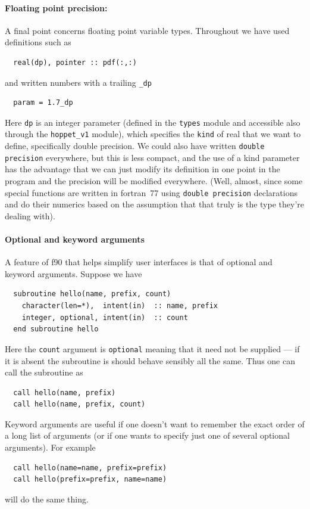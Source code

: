 \documentclass[12pt]{article}
\newcommand{\ttt}[1]{\texttt{#1}}
\begin{document}
\paragraph{Floating point precision:}
A final point concerns floating point variable types. Throughout we
have used definitions such as
\begin{verbatim}
  real(dp), pointer :: pdf(:,:)
\end{verbatim}
and written numbers with a trailing \texttt{\_dp}
\begin{verbatim}
  param = 1.7_dp
\end{verbatim}
Here \texttt{dp} is an integer parameter (defined in the
\texttt{types} module and accessible also through the
\texttt{hoppet\_v1} module), which specifies the \texttt{kind} of real
that we want to define, specifically double precision. We could also
have written \texttt{double precision} everywhere, but this is less
compact, and the use of a kind parameter has the advantage that we
can just modify its definition in one point in the program and the
precision will be modified everywhere. (Well, almost, since some
special functions are written in fortran~77 using \texttt{double
  precision} declarations and do their numerics based on the
assumption that that truly is the type they're dealing with).


\paragraph{Optional and keyword arguments}

A feature of f90 that helps simplify user interfaces is that of
optional and keyword arguments. Suppose we have
\begin{verbatim}
  subroutine hello(name, prefix, count)
    character(len=*),  intent(in)  :: name, prefix
    integer, optional, intent(in)  :: count
  end subroutine hello
\end{verbatim}
Here the \ttt{count} argument is \ttt{optional} meaning that it need
not be supplied --- if it is absent the subroutine is should behave
sensibly all the same. Thus one can call the subroutine as
\begin{verbatim}
  call hello(name, prefix)
  call hello(name, prefix, count)
\end{verbatim}
Keyword arguments are useful if one doesn't want to remember the exact
order of a long list of arguments (or if one wants to specify just one
of several optional arguments). For example
\begin{verbatim}
  call hello(name=name, prefix=prefix)
  call hello(prefix=prefix, name=name)
\end{verbatim}
will do the same thing.
\end{document}
